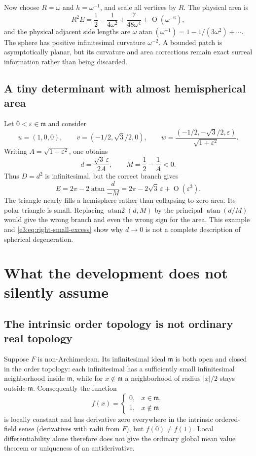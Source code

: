 \documentclass[11pt,letterpaper]{article}
\numberwithin{equation}{section}
\theoremstyle{definition}
\theoremstyle{remark}
\newcommand{\mm}{\mathfrak m}
\newcommand{\eps}{\varepsilon}
\newcommand{\atan}{\operatorname{atan}}
\newcommand{\atantwo}{\operatorname{atan2}}
\newcommand{\smallO}{\operatorname{O}}
\begin{document}
Now choose $R=\omega$ and $h=\omega^{-1}$, and scale all vertices
by $R$. The physical area is
\[
 R^2E=\frac12-\frac1{4\omega^2}
       +\frac7{48\omega^4}+\smallO(\omega^{-6}),
\]
and the physical adjacent side lengths are
$\omega\atan(\omega^{-1})=1-1/(3\omega^2)+\cdots$.
The sphere has positive infinitesimal curvature $\omega^{-2}$.
A bounded patch is asymptotically planar, but its curvature and area
corrections remain exact surreal information rather than being discarded.

\subsection{A tiny determinant with almost hemispherical area}

Let $0<\eps\in\mm$ and consider
\[
 u=(1,0,0),\qquad v=(-1/2,\sqrt3/2,0),\qquad
 w=\frac{(-1/2,-\sqrt3/2,\eps)}{\sqrt{1+\eps^2}}.
\]
Writing $A=\sqrt{1+\eps^2}$, one obtains
\[
 d=\frac{\sqrt3\,\eps}{2A},\qquad M=\frac12-\frac1A<0.
\]
Thus $D=d^2$ is infinitesimal, but the correct branch gives
\begin{equation}\label{e3:eq:hemisphere-example}
 E=2\pi-2\atan\frac{d}{-M}
   =2\pi-2\sqrt3\,\eps+\smallO(\eps^3).
\end{equation}
The triangle nearly fills a hemisphere rather than collapsing to zero
area. Its polar triangle is small. Replacing $\atantwo(d,M)$ by the
principal $\atan(d/M)$ would give the wrong branch and even the wrong
sign for the area. This example and \cref{e3:eq:right-small-excess}
show why $d\to0$ is not a complete description of spherical degeneration.

\section{What the development does not silently assume}\label{e3:sec:boundaries}

\subsection{The intrinsic order topology is not ordinary real topology}

Suppose $F$ is non-Archimedean. Its infinitesimal ideal $\mm$ is both
open and closed in the order topology: each infinitesimal has a
sufficiently small infinitesimal neighborhood inside $\mm$, while for
$x\notin\mm$ a neighborhood of radius $|x|/2$ stays outside $\mm$.
Consequently the function
\[
 f(x)=\begin{cases}0,&x\in\mm,\\1,&x\notin\mm\end{cases}
\]
is locally constant and has derivative zero everywhere in the intrinsic
ordered-field sense (derivatives with radii from $F$), but $f(0)\ne f(1)$. Local differentiability alone
therefore does not give the ordinary global mean value theorem or
uniqueness of an antiderivative.
\end{document}
